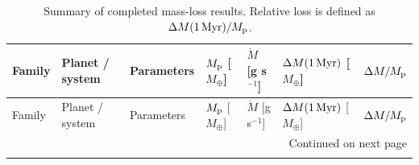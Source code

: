 \begin{longtable}{@{}p{2.1cm}p{2.8cm}p{2.8cm}p{1.7cm}p{2.0cm}p{2.0cm}p{1.8cm}@{}}
\caption{Summary of completed mass-loss results. Relative loss is defined as $\Delta M(1\,{\rm Myr})/M_{\rm p}$.}\label{tab:mass_loss_summary_all_cases} \\
\toprule
Family & Planet / system & Parameters & $M_{\rm p}$ [$M_\oplus$] & $\dot{M}$ [g s$^{-1}$] & $\Delta M(1\,{\rm Myr})$ [$M_\oplus$] & $\Delta M / M_{\rm p}$ \\
\midrule
\endfirsthead

\toprule
Family & Planet / system & Parameters & $M_{\rm p}$ [$M_\oplus$] & $\dot{M}$ [g s$^{-1}$] & $\Delta M(1\,{\rm Myr})$ [$M_\oplus$] & $\Delta M / M_{\rm p}$ \\
\midrule
\endhead

\midrule
\multicolumn{7}{r}{Continued on next page} \\
\midrule
\endfoot

\bottomrule
\endlastfoot


\end{longtable}

